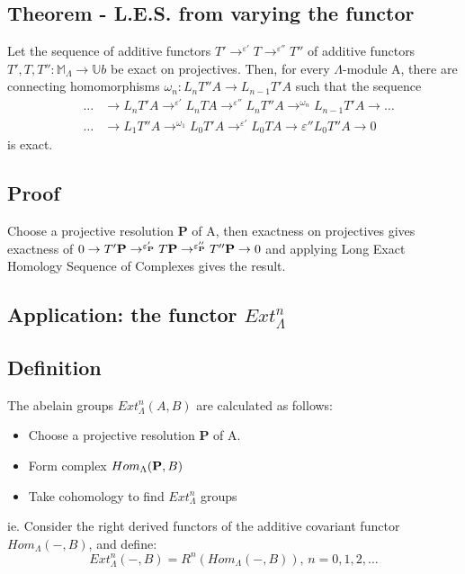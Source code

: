 \subsection{Theorem - L.E.S. from varying the
functor}\label{df1.5.5} Let the sequence of additive functors
$T'\rightarrow^{\varepsilon'} T\rightarrow^{\varepsilon''} T''$ of
additive functors $T',T,T'':\mathbb M_\Lambda \rightarrow \mathbb
Ub$ be exact on projectives. Then, for every $\Lambda$-module A,
there are connecting homomorphisms $\omega_n:L_nT''A\rightarrow
L_{n-1}T'A$ such that the sequence
\begin{eqnarray}
\nonumber  &\dots&\rightarrow
L_nT'A\rightarrow^{\varepsilon'}L_nTA\rightarrow^{\varepsilon''}L_nT''A\rightarrow^{\omega_n}
L_{n-1}T'A\rightarrow\dots\\
\nonumber  &\dots&\rightarrow L_1T''A\rightarrow^{\omega_1}
L_0T'A\rightarrow^{\varepsilon'} L_0TA\rightarrow{\varepsilon''}
L_0T''A\rightarrow 0
\end{eqnarray} is exact.

\subsection*{Proof}
Choose a projective resolution \textbf P of A, then exactness on
projectives gives exactness of $0\rightarrow T'\textbf
P\rightarrow^{\varepsilon'_\textbf P} T\textbf
P\rightarrow^{\varepsilon''_\textbf P}T''\textbf P\rightarrow 0$
and applying Long Exact Homology Sequence of Complexes gives the
result.


\subsection{Application: the functor $Ext^n_\Lambda$}\label{df1.6}
\subsection{Definition}\label{df1.6.1}
The abelain groups $Ext_\Lambda^n(A,B)$ are calculated as follows:
\begin{itemize}
    \item Choose a projective resolution \textbf P of A.
    \item Form complex $Hom_\Lambda (\textbf P, B)$
    \item Take cohomology to find $Ext^n_\Lambda$ groups
\end{itemize}
ie. Consider the right derived functors of the additive covariant
functor \\ $Hom_\Lambda(-,B)$, and define:
$$Ext^n_\Lambda (-,B) = R^n(Hom_\Lambda (-,B)),\, n=0,1,2,\dots$$

